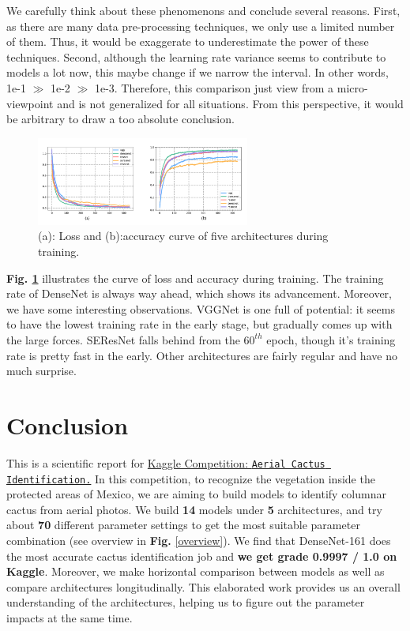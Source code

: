 \documentclass[10pt,twocolumn,letterpaper]{article}
\begin{document}
We carefully think about these phenomenons and conclude several reasons. First, as there are many data pre-processing techniques, we only use a limited number of them. Thus, it would be exaggerate to underestimate the power of these techniques. Second, although the learning rate variance seems to contribute to models a lot now, this maybe change if we narrow the interval. In other words, 1e-1 $\gg$ 1e-2 $\gg$ 1e-3. Therefore, this comparison just view from a micro-viewpoint and is not generalized for all situations. From this perspective, it would be arbitrary to draw a too absolute conclusion.

\begin{figure}[h]
\centering
\includegraphics[width=7cm]{loss_total.pdf}
\caption{(a): Loss and (b):accuracy curve of five architectures during training.}
\label{lossacctotal}
\end{figure}

\textbf{Fig. \ref{lossacctotal}} illustrates the curve of loss and accuracy during training. The training rate of \textsf{DenseNet} is always way ahead, which shows its advancement. Moreover, we have some interesting observations. \textsf{VGGNet} is one full of potential: it seems to have the lowest training rate in the early stage, but gradually comes up with the large forces. \textsf{SEResNet} falls behind from the $60^{th}$ epoch, though it's training rate is pretty fast in the early. Other architectures are fairly regular and have no much surprise.


\section{Conclusion} \label{SECconclustion}

This is a scientific report for \href{https://www.kaggle.com/c/aerial-cactus-identification/overview}{Kaggle Competition: \texttt{Aerial Cactus Identification.}} In this competition, to recognize the vegetation inside the protected areas of Mexico, we are aiming to build models to identify columnar cactus from aerial photos. We build \textbf{14} models under \textbf{5} architectures, and try about \textbf{70} different parameter settings to get the most suitable parameter combination (see overview in \textbf{Fig.} \ref{overview}). We find that \textsf{DenseNet-161} does the most accurate cactus identification job and \textbf{we get grade 0.9997 / 1.0 on Kaggle}. Moreover, we make horizontal comparison between models as well as compare architectures longitudinally. This elaborated work provides us an overall understanding of the architectures, helping us to figure out the parameter impacts at the same time.
\end{document}
